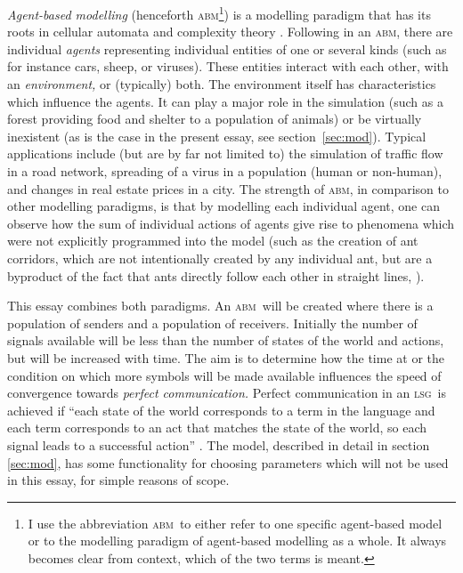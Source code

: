 \documentclass[
	DIV=calc,
	BCOR=0mm,
	pagesize,
]{scrartcl}
\newcommand{\abm}{\textsc{abm}}
\newcommand{\lsg}{\textsc{lsg}}
\begin{document}
\emph{Agent-based modelling} (henceforth \abm\footnote{I use the abbreviation \abm\ to either refer to one specific agent-based model or to the modelling paradigm of agent-based modelling as a whole. It always becomes clear from context, which of the two terms is meant.}) is a modelling paradigm that has its roots in cellular automata and complexity theory \citep{heath_some_2014}.
Following \citet{grimm_individual_2005,railsback_agent_2011} in an \abm, there are individual \emph{agents} representing individual entities of one or several kinds (such as for instance cars, sheep, or viruses).
These entities interact with each other, with an \emph{environment,} or (typically) both.
The environment itself has characteristics which influence the agents.
It can play a major role in the simulation (such as a forest providing food and shelter to a population of animals) or be virtually inexistent (as is the case in the present essay, see section~\ref{sec:mod}).
Typical applications include (but are by far not limited to) the simulation of traffic flow in a road network, spreading of a virus in a population (human or non-human), and changes in real estate prices in a city.
The strength of \abm, in comparison to other modelling paradigms, is that  by modelling each individual agent, one can observe how the sum of individual actions of agents give rise to phenomena which were not explicitly programmed into the model (such as the creation of ant corridors, which are not intentionally created by any individual ant, but are a byproduct of the fact that ants directly follow each other in straight lines, \citet{wilensky_netlogo_1997}).

This essay combines both paradigms.
An \abm\ will be created where there is a population of senders and a population of receivers.
Initially the number of signals available will be less than the number of states of the world and actions, but will be increased with time.
The aim is to determine how the time at or the condition on which more symbols will be made available influences the speed of convergence towards \emph{perfect communication.}
Perfect communication in an \lsg\ is achieved if ``each state of the world corresponds to a term in the language and each term corresponds to an act that matches the state of the world, so each signal leads to a successful action'' \citep[p.~530, there referred to as ``perfect Lewis signalling system'']{barrett_dynamic_2007}.
The model, described in detail in section \ref{sec:mod}, has some functionality for choosing parameters which will not be used in this essay, for simple reasons of scope.
\end{document}
